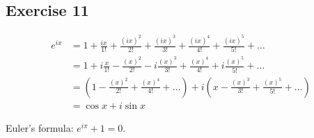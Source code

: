 \documentclass[11pt]{article}
\begin{document}
\subsection{Exercise 11}

\begin{align*}
e^{ix} &= 1 + \frac{ix}{1!} + \frac{(ix)^2}{2!} + \frac{(ix)^3}{3!} + \frac{(ix)^4}{4!} + \frac{(ix)^5}{5!} + \dots \\
&= 1 + i\frac{x}{1!} - \frac{(x)^2}{2!} - i\frac{(x)^3}{3!} + \frac{(x)^4}{4!} + i\frac{(x)^5}{5!} + \dots \\
&= (1 - \frac{(x)^2}{2!} + \frac{(x)^4}{4!} + \dots{}) + i(x - \frac{(x)^3}{3!} + \frac{(x)^5}{5!} + \dots) \\
&= \cos x + i \sin x
\end{align*}

Euler's formula: $e^{i \pi}+ 1 = 0$.
\end{document}
